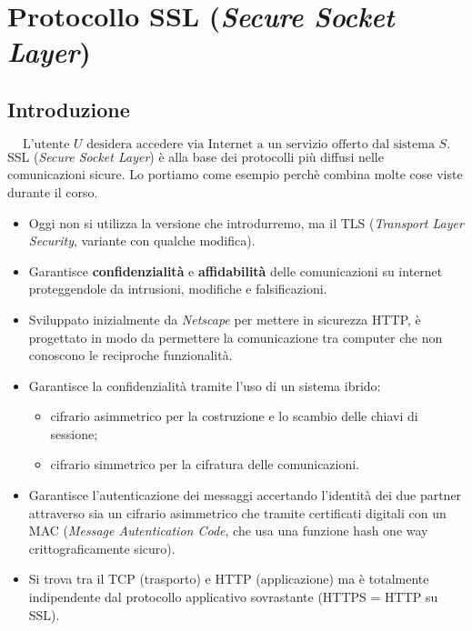 \chapter{Protocollo SSL (\emph{Secure Socket Layer})}
\section{Introduzione}
\[\boxed{\text{L'utente $U$ desidera accedere via Internet a un servizio offerto dal sistema $S$.}}\]
SSL (\emph{Secure Socket Layer}) è alla base dei protocolli più diffusi nelle comunicazioni sicure. Lo portiamo come esempio perchè combina molte cose viste durante il corso. 
\begin{itemize}
	\item Oggi non si utilizza la versione che introdurremo, ma il TLS (\emph{Transport Layer Security}, variante con qualche modifica).
	\item Garantisce \textbf{confidenzialità} e \textbf{affidabilità} delle comunicazioni su internet proteggendole da intrusioni, modifiche e falsificazioni.
	\item Sviluppato inizialmente da \textit{Netscape} per mettere in sicurezza HTTP, è progettato in modo da permettere la comunicazione tra computer che non conoscono le reciproche funzionalità.
	\item Garantisce la confidenzialità tramite l'uso di un sistema ibrido: 
	\begin{itemize}
		\item cifrario asimmetrico per la costruzione e lo scambio delle chiavi di sessione;
		\item cifrario simmetrico per la cifratura delle comunicazioni.
	\end{itemize}
	\item Garantisce l'autenticazione dei messaggi accertando l'identità dei due partner attraverso sia un cifrario asimmetrico che tramite certificati digitali con un MAC (\emph{Message Autentication Code}, che usa una funzione hash one way crittograficamente sicuro).
	\item Si trova tra il TCP (trasporto) e HTTP (applicazione) ma è totalmente indipendente dal protocollo applicativo sovrastante (HTTPS = HTTP su SSL).
\end{itemize}

